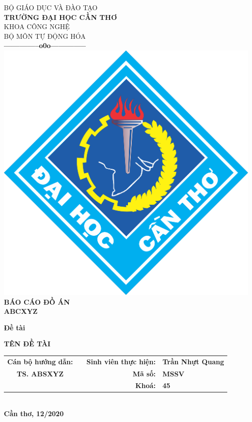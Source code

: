 \documentclass{standalone}
\begin{document}
\begin{titlepage}

\begin{center}
	{BỘ GIÁO DỤC VÀ ĐÀO TẠO}\\
	\textbf{TRƯỜNG ĐẠI HỌC CẦN THƠ}\\
	{KHOA CÔNG NGHỆ}\\
	{BỘ MÔN TỰ ĐỘNG HÓA}\\
	\textbf{--------------o0o--------------}\\[1.5cm]
	\includegraphics[scale=.12]{images/ctu-logo}\\[2.5cm]
	
	\textbf{BÁO CÁO ĐỒ ÁN\\}
	\textbf{ABCXYZ\\[2cm]}
	
	\begin{large}
	\textbf{Đề tài\\[0.5cm]}
	\end{large}
	\textbf{{\LARGE TÊN ĐỀ TÀI}}
	\\[2cm]
	

	\begin{tabular}{ c c r l }
	 \textbf{Cán bộ hướng dẫn:} & & \textbf{Sinh viên thực hiện:} & \textbf{Trần Nhựt Quang}\\ 
	 \textbf{TS. ABSXYZ} & & \textbf{Mã số:} & \textbf{MSSV}\\  
	 & & \textbf{Khoá:} & \textbf{45}
	\end{tabular}\\[2.5cm]
	\textbf{Cần thơ, 12/2020}
\end{center}

\end{titlepage}
\end{document}
